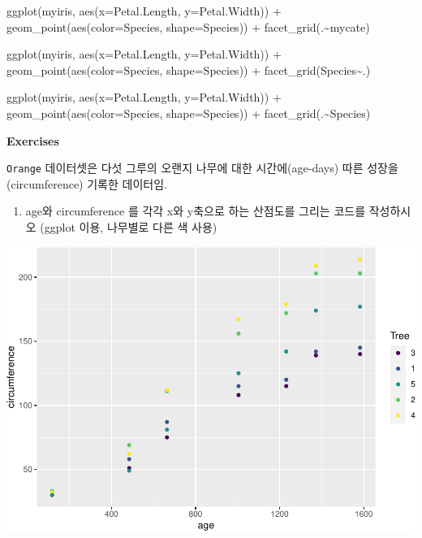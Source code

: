\documentclass[
]{book}
\newenvironment{Shaded}{\begin{snugshade}}{\end{snugshade}}
\newcommand{\AttributeTok}[1]{\textcolor[rgb]{0.77,0.63,0.00}{#1}}
\newcommand{\FunctionTok}[1]{\textcolor[rgb]{0.00,0.00,0.00}{#1}}
\newcommand{\NormalTok}[1]{#1}
\newcommand{\SpecialCharTok}[1]{\textcolor[rgb]{0.00,0.00,0.00}{#1}}
\providecommand{\tightlist}{%
  \setlength{\itemsep}{0pt}\setlength{\parskip}{0pt}}
\begin{document}
\begin{Shaded}
\begin{Highlighting}[]
\FunctionTok{ggplot}\NormalTok{(myiris, }\FunctionTok{aes}\NormalTok{(}\AttributeTok{x=}\NormalTok{Petal.Length, }\AttributeTok{y=}\NormalTok{Petal.Width)) }\SpecialCharTok{+} 
  \FunctionTok{geom\_point}\NormalTok{(}\FunctionTok{aes}\NormalTok{(}\AttributeTok{color=}\NormalTok{Species, }\AttributeTok{shape=}\NormalTok{Species)) }\SpecialCharTok{+}
  \FunctionTok{facet\_grid}\NormalTok{(.}\SpecialCharTok{\textasciitilde{}}\NormalTok{mycate)}

\FunctionTok{ggplot}\NormalTok{(myiris, }\FunctionTok{aes}\NormalTok{(}\AttributeTok{x=}\NormalTok{Petal.Length, }\AttributeTok{y=}\NormalTok{Petal.Width)) }\SpecialCharTok{+} 
  \FunctionTok{geom\_point}\NormalTok{(}\FunctionTok{aes}\NormalTok{(}\AttributeTok{color=}\NormalTok{Species, }\AttributeTok{shape=}\NormalTok{Species)) }\SpecialCharTok{+}
  \FunctionTok{facet\_grid}\NormalTok{(Species}\SpecialCharTok{\textasciitilde{}}\NormalTok{.)}

\FunctionTok{ggplot}\NormalTok{(myiris, }\FunctionTok{aes}\NormalTok{(}\AttributeTok{x=}\NormalTok{Petal.Length, }\AttributeTok{y=}\NormalTok{Petal.Width)) }\SpecialCharTok{+} 
  \FunctionTok{geom\_point}\NormalTok{(}\FunctionTok{aes}\NormalTok{(}\AttributeTok{color=}\NormalTok{Species, }\AttributeTok{shape=}\NormalTok{Species)) }\SpecialCharTok{+}
  \FunctionTok{facet\_grid}\NormalTok{(.}\SpecialCharTok{\textasciitilde{}}\NormalTok{Species)}
\end{Highlighting}
\end{Shaded}

\textbf{Exercises}

\texttt{Orange} 데이터셋은 다섯 그루의 오랜지 나무에 대한 시간에(age-days) 따른 성장을(circumference) 기록한 데이터임.

\begin{enumerate}
\def\labelenumi{\arabic{enumi})}
\tightlist
\item
  age와 circumference 를 각각 x와 y축으로 하는 산점도를 그리는 코드를 작성하시오 (ggplot 이용, 나무별로 다른 색 사용)
\end{enumerate}

\includegraphics{07-ggplot_files/figure-latex/unnamed-chunk-41-1.pdf}
\end{document}
